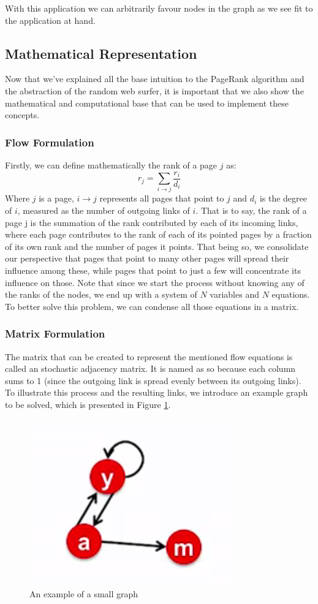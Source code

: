 With this application we can arbitrarily favour nodes in the graph as we see fit to the application at hand.

\subsection{Mathematical Representation}
Now that we've explained all the base intuition to the PageRank algorithm and the abstraction of the random web surfer, it is important that we also show the mathematical and computational base that can be used to implement these concepts.
\subsubsection{Flow Formulation}
Firstly, we can define mathematically the rank of a page $j$ as:
\[
r_j = \sum_{i \rightarrow j} \dfrac{r_i}{d_i}
\]
Where $j$ is a page, $i \rightarrow j$ represents all pages that point to $j$ and $d_i$ is the degree of $i$, measured as the number of outgoing links of $i$.
That is to say, the rank of a page j is the summation of the rank contributed by each of its incoming links, where each page contributes to the rank of each of its pointed pages by a fraction of its own rank and the number of pages it points. That being so, we consolidate our perspective that pages that point to many other pages will spread their influence among these, while pages that point to just a few will concentrate its influence on those. Note that since we start the process without knowing any of the ranks of the nodes, we end up with a system of $N$ variables and $N$ equations. To better solve this problem, we can condense all those equations in a matrix.

\subsubsection{Matrix Formulation}
The matrix that can be created to represent the mentioned flow equations is called an stochastic adjacency matrix. It is named as so because each column sums to 1 (since the outgoing link is spread evenly between its outgoing links). To illustrate this process and the resulting links, we introduce an example graph to be solved, which is presented in Figure \ref{fig:graphexample}.

\begin{figure}[ht]
    \centering
    \includegraphics[width=0.4\linewidth]{Cap4/SmallGraph}
    \caption{An example of a small graph}
    \label{fig:graphexample}
\end{figure}

